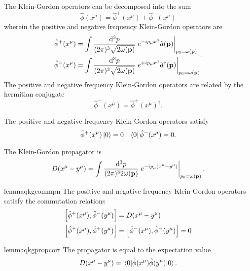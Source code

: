 \begin{definition}
	The Klein-Gordon operators can be decomposed into the sum
	\begin{equation}
		\hat\phi(x^\mu)
		=
		\hat\phi^+(x^\mu)
		+
		\hat\phi^-(x^\mu)
	\end{equation}
	wherein the positive and negative frequency Klein-Gordon operators are
	\begin{equation}
		\begin{split}
			\hat\phi^+(x^\mu)
			&=
			\int\frac{\dd[3]{p}}{(2\pi)^3\sqrt{2\omega(\vb{p})}}
			\eval{
				e^{-ip_\mu x^\mu}
				\hat{a}(\vb{p})
			}_{p_0=\omega(\vb{p})}
			\\
			\hat\phi^-(x^\mu)
			&=
			\int\frac{\dd[3]{p}}{(2\pi)^3\sqrt{2\omega(\vb{p})}}
			\eval{
				e^{+ip_\mu x^\mu}
				\hat{a}^\dagger(\vb{p})
			}_{p_0=\omega(\vb{p})}
		\end{split}
		\label{eq:qkg_positive_negative_frequency}
		.
	\end{equation}
	The positive and negative frequency Klein-Gordon operators are related by the hermitian conjugate
	\begin{equation}
		\hat\phi^-(x^\mu)
		=
		\hat\phi^+(x^\mu)^\dagger
		.
	\end{equation}
\end{definition}
\begin{corollary}\label{thm:vacuum_state_pn}
	The positive and negative frequency Klein-Gordon operators satisfy
	\begin{align}
		\hat\phi^+(x^\mu)
		\ket{0}
		=
		0
		&&
		\bra{0}
		\hat\phi^-(x^\mu)
		=
		0
		\label{eq:vacuum_state_pn}
		.
	\end{align}
\end{corollary}
\begin{definition}
	The Klein-Gordon propagator is
	\begin{equation}
		D(x^\mu-y^\mu)
		=
		\int\frac{\dd[3]{p}}{(2\pi)^32\omega(\vb{p})}
		\eval{
			e^{-ip_\mu (x^\mu-y^\mu)}
		}_{p_0=\omega(\vb{p})}
		.
	\end{equation}
\end{definition}
\begin{restatable}{lemma}{qkgcommpn}\label{thm:qkg_comm_pn}
	The positive and negative frequency Klein-Gordon operators satisfy the commutation relations
	\begin{align}
		\comm{\hat\phi^+(x^\mu)}{\hat\phi^-(y^\mu)}
		&=
		D(x^\mu-y^\mu)
		\\
		\comm{\hat\phi^+(x^\mu)}{\hat\phi^+(y^\mu)}
		&=
		\comm{\hat\phi^-(x^\mu)}{\hat\phi^-(y^\mu)}
		=
		0
	\end{align}
\end{restatable}
\begin{restatable}{lemma}{qkgpropcorr}\label{thm:qkg_prop_corr}
	The propagator is equal to the expectation value
	\begin{equation}
		D(x^\mu-y^\mu)
		=
		\expval{\hat\phi(x^\mu)\hat\phi(y^\mu)}{0}
		.
	\end{equation}
\end{restatable}

